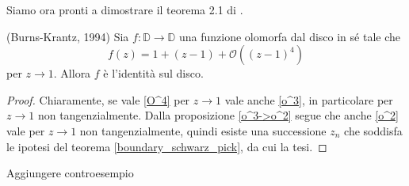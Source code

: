 Siamo ora pronti a dimostrare il teorema 2.1 di \cite{BK}.

\begin{thm} \label{burns_krantz}
  (Burns-Krantz, 1994) Sia $f:\mathbb{D} \longrightarrow \mathbb{D}$ una funzione olomorfa dal disco in sé tale che
  \begin{equation} \label{O^4}
    f(z)=1+(z-1)+\mathcal{O}((z-1)^4)
  \end{equation}
  per $z \longrightarrow 1$. Allora $f$ è l'identità sul disco.
\end{thm}


\begin{proof}
  Chiaramente, se vale \eqref{O^4} per $z \longrightarrow 1$ vale anche \eqref{o^3}, in particolare per $z \longrightarrow 1$ non tangenzialmente. Dalla proposizione \ref{o^3->o^2} segue che anche \eqref{o^2} vale per $z \longrightarrow 1$ non tangenzialmente, quindi esiste una successione $z_n$ che soddisfa le ipotesi del teorema \ref{boundary_schwarz_pick}, da cui la tesi.
\end{proof}

Aggiungere controesempio
